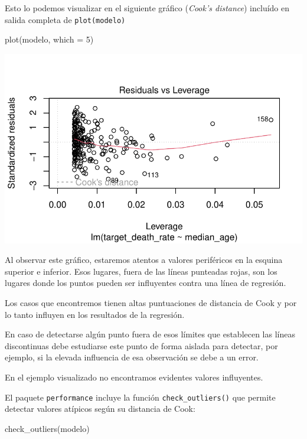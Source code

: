 \documentclass[
  letterpaper,
  DIV=11,
  numbers=noendperiod]{scrartcl}
\newenvironment{Shaded}{\begin{snugshade}}{\end{snugshade}}
\newcommand{\AttributeTok}[1]{\textcolor[rgb]{0.40,0.45,0.13}{#1}}
\newcommand{\DecValTok}[1]{\textcolor[rgb]{0.68,0.00,0.00}{#1}}
\newcommand{\FunctionTok}[1]{\textcolor[rgb]{0.28,0.35,0.67}{#1}}
\newcommand{\NormalTok}[1]{\textcolor[rgb]{0.00,0.23,0.31}{#1}}
\begin{document}
Esto lo podemos visualizar en el siguiente gráfico (\emph{Cook's
distance}) incluído en salida completa de \texttt{plot(modelo)}

\begin{Shaded}
\begin{Highlighting}[]
\FunctionTok{plot}\NormalTok{(modelo, }\AttributeTok{which =} \DecValTok{5}\NormalTok{)}
\end{Highlighting}
\end{Shaded}

\begin{center}
\includegraphics{index_files/figure-pdf/unnamed-chunk-38-1.pdf}
\end{center}

Al observar este gráfico, estaremos atentos a valores periféricos en la
esquina superior e inferior. Esos lugares, fuera de las líneas punteadas
rojas, son los lugares donde los puntos pueden ser influyentes contra
una línea de regresión.

Los casos que encontremos tienen altas puntuaciones de distancia de Cook
y por lo tanto influyen en los resultados de la regresión.

En caso de detectarse algún punto fuera de esos límites que establecen
las líneas discontinuas debe estudiarse este punto de forma aislada para
detectar, por ejemplo, si la elevada influencia de esa observación se
debe a un error.

En el ejemplo visualizado no encontramos evidentes valores influyentes.

El paquete \texttt{performance} incluye la función
\texttt{check\_outliers()} que permite detectar valores atípicos según
su distancia de Cook:

\begin{Shaded}
\begin{Highlighting}[]
\FunctionTok{check\_outliers}\NormalTok{(modelo) }
\end{Highlighting}
\end{Shaded}
\end{document}
